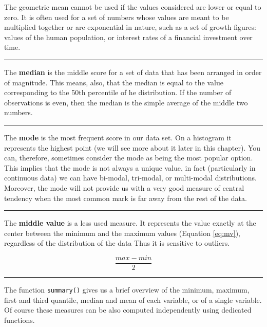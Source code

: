 \documentclass[
]{svmono}
\begin{document}
The geometric mean cannot be used if the values considered are lower
or equal to zero. It is often used for a set of numbers whose values are
meant to be multiplied together or are exponential in nature, such as a
set of growth figures: values of the human population, or interest rates
of a financial investment over time.

\begin{center}\rule{0.5\linewidth}{0.5pt}\end{center}

The \textbf{median} is the middle score for a set of data that has been
arranged in order of magnitude. This means, also, that the median is
equal to the value corresponding to the 50th percentile of he
distribution. If the number of observations is even, then the median is
the simple average of the middle two numbers.

\begin{center}\rule{0.5\linewidth}{0.5pt}\end{center}

The \textbf{mode} is the most frequent score in our data set. On a histogram
it represents the highest point (we will see more about it later in this
chapter). You can, therefore, sometimes consider the mode as being the
most popular option. This implies that the mode is not always a unique
value, in fact (particularly in continuous data) we can have bi-modal,
tri-modal, or multi-modal distributions. Moreover, the mode will not
provide us with a very good measure of central tendency when the most
common mark is far away from the rest of the data.

\begin{center}\rule{0.5\linewidth}{0.5pt}\end{center}

The \textbf{middle value} is a less used measure. It represents the value
exactly at the center between the minimum and the maximum values
(Equation \eqref{eq:mv}), regardless of the distribution of the data Thus it is
sensitive to outliers.

\begin{equation}
\frac{max-min}{2}
\label{eq:mv}
\end{equation}

\begin{center}\rule{0.5\linewidth}{0.5pt}\end{center}

The function \texttt{summary()} gives us a brief overview of the minimum,
maximum, first and third quantile, median and mean of each variable, or
of a single variable. Of course these measures can be also computed
independently using dedicated functions.
\end{document}
